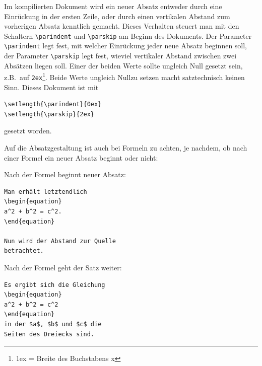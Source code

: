 \documentclass[arbeit=master,oneside,BCOR=12mm]{ArbeitRST}
\begin{document}
Im kompilierten Dokument wird ein neuer Absatz entweder durch eine Einrückung in der ersten Zeile, oder durch einen vertikalen Abstand zum vorherigen Absatz kenntlich gemacht. Dieses Verhalten steuert man mit den Schaltern \texttt{\textbackslash parindent} und \texttt{\textbackslash parskip} am Beginn des Dokuments. Der Parameter \texttt{\textbackslash parindent} legt fest, mit welcher Einrückung jeder neue Absatz beginnen soll, der Parameter \texttt{\textbackslash parskip} legt fest, wieviel vertikaler Abstand zwischen zwei Absätzen liegen soll. Einer der beiden Werte sollte ungleich Null gesetzt sein, z.B.~auf \texttt{2ex}\footnote{1ex = Breite des Buchstabens x}. Beide Werte ungleich Nullzu setzen macht satztechnisch keinen Sinn. Dieses Dokument ist mit
\begin{verbatim}
\setlength{\parindent}{0ex}
\setlength{\parskip}{2ex}
\end{verbatim}
gesetzt worden.

Auf die Absatzgestaltung ist auch bei Formeln zu achten, je nachdem, ob nach einer Formel ein neuer Absatz beginnt oder nicht:

\begin{minipage}[t]{0.45\linewidth}
Nach der Formel beginnt neuer Absatz:
\begin{verbatim}
Man erhält letztendlich
\begin{equation}
a^2 + b^2 = c^2.
\end{equation}

Nun wird der Abstand zur Quelle
betrachtet.
\end{verbatim}
\end{minipage}
\hfill
\begin{minipage}[t]{0.45\linewidth}
Nach der Formel geht der Satz weiter:
\begin{verbatim}
Es ergibt sich die Gleichung
\begin{equation}
a^2 + b^2 = c^2
\end{equation}
in der $a$, $b$ und $c$ die
Seiten des Dreiecks sind.
\end{verbatim}
\end{minipage}


\end{document}
